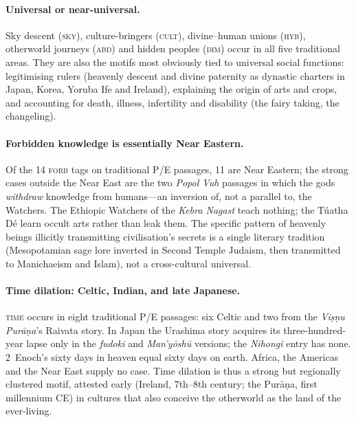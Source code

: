 \documentclass[11pt,a4paper]{article}
\begin{document}
\paragraph{Universal or near-universal.} Sky descent (\textsc{sky}), culture-bringers (\textsc{cult}), divine--human unions (\textsc{hyb}), otherworld journeys (\textsc{abd}) and hidden peoples (\textsc{dim}) occur in all five traditional areas. They are also the motifs most obviously tied to universal social functions: legitimising rulers (heavenly descent and divine paternity as dynastic charters in Japan, Korea, Yoruba Ife and Ireland), explaining the origin of arts and crops, and accounting for death, illness, infertility and disability (the fairy taking, the changeling).

\paragraph{Forbidden knowledge is essentially Near Eastern.} Of the 14 \textsc{forb} tags on traditional P/E passages, 11 are Near Eastern; the strong cases outside the Near East are the two \emph{Popol Vuh} passages in which the gods \emph{withdraw} knowledge from humans---an inversion of, not a parallel to, the Watchers. The Ethiopic Watchers of the \emph{Kebra Nagast} teach nothing; the Túatha Dé learn occult arts rather than leak them. The specific pattern of heavenly beings illicitly transmitting civilisation's secrets is a single literary tradition (Mesopotamian sage lore inverted in Second Temple Judaism, then transmitted to Manichaeism and Islam), not a cross-cultural universal.

\paragraph{Time dilation: Celtic, Indian, and late Japanese.} \textsc{time} occurs in eight traditional P/E passages: six Celtic and two from the \emph{Viṣṇu Purāṇa}'s Raivata story. In Japan the Urashima story acquires its three-hundred-year lapse only in the \emph{fudoki} and \emph{Man'yōshū} versions; the \emph{Nihongi} entry has none. 2~Enoch's sixty days in heaven equal sixty days on earth. Africa, the Americas and the Near East supply no case. Time dilation is thus a strong but regionally clustered motif, attested early (Ireland, 7th--8th century; the Purāṇa, first millennium CE) in cultures that also conceive the otherworld as the land of the ever-living.
\end{document}
